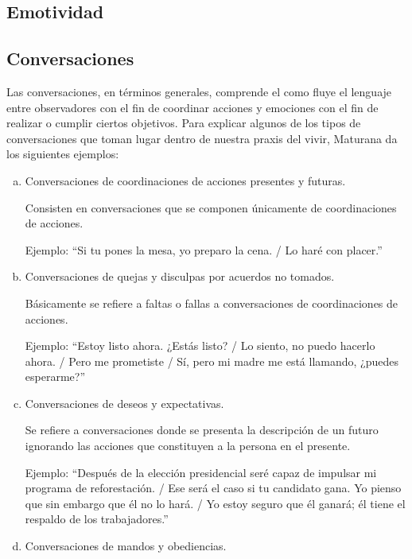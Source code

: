 \documentclass[10pt]{article}
\begin{document}
        \subsection{Emotividad}


        \subsection{Conversaciones}

        Las conversaciones, en términos generales, comprende el como fluye el lenguaje entre observadores con el fin de coordinar acciones y emociones con el fin de realizar o cumplir ciertos objetivos. Para explicar algunos de los tipos de conversaciones que toman lugar dentro de nuestra praxis del vivir, Maturana da los siguientes ejemplos:

        \begin{enumerate}[a.]
        \item Conversaciones de coordinaciones de acciones presentes y futuras.
        
        Consisten en conversaciones que se componen únicamente de coordinaciones de acciones.

        Ejemplo: ``Si tu pones la mesa, yo preparo la cena. / Lo haré con placer.''

        
        \item Conversaciones de quejas y disculpas por acuerdos no tomados.
            
        Básicamente se refiere a faltas o fallas a conversaciones de coordinaciones de acciones.
                
        Ejemplo: ``Estoy listo ahora. ¿Estás listo? / Lo siento, no puedo hacerlo ahora. / Pero me prometiste / Sí, pero mi madre me está llamando, ¿puedes esperarme?''
        
        \item Conversaciones de deseos y expectativas.
            
        Se refiere a conversaciones donde se presenta la descripción de un futuro ignorando las acciones que constituyen a la persona en el presente.

        Ejemplo: ``Después de la elección presidencial seré capaz de impulsar mi programa de reforestación. / Ese será el caso si tu candidato gana. Yo pienso que sin embargo que él no lo hará. / Yo estoy seguro que él ganará; él tiene el respaldo de los trabajadores.''
        
        \item Conversaciones de mandos y obediencias.


\end{enumerate}
\end{document}
